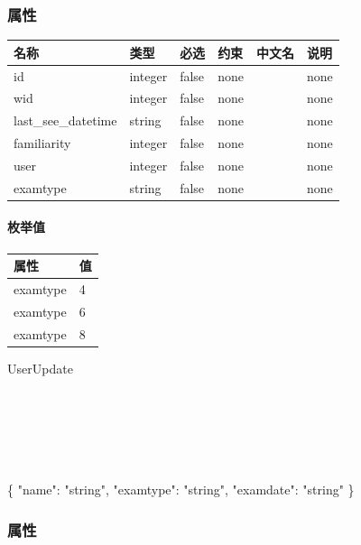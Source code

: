 \documentclass[
]{article}
\newenvironment{Shaded}{}{}
\newcommand{\DataTypeTok}[1]{\textcolor[rgb]{0.56,0.13,0.00}{#1}}
\newcommand{\FunctionTok}[1]{\textcolor[rgb]{0.02,0.16,0.49}{#1}}
\newcommand{\StringTok}[1]{\textcolor[rgb]{0.25,0.44,0.63}{#1}}
\begin{document}
\hypertarget{ux5c5eux6027-2}{%
\subsubsection{属性}\label{ux5c5eux6027-2}}

\begin{longtable}[]{@{}llllll@{}}
\toprule
名称 & 类型 & 必选 & 约束 & 中文名 & 说明 \\
\midrule
\endhead
id & integer & false & none & & none \\
wid & integer & false & none & & none \\
last\_see\_datetime & string & false & none & & none \\
familiarity & integer & false & none & & none \\
user & integer & false & none & & none \\
examtype & string & false & none & & none \\
\bottomrule
\end{longtable}

\hypertarget{ux679aux4e3eux503c-9}{%
\paragraph{枚举值}\label{ux679aux4e3eux503c-9}}

\begin{longtable}[]{@{}ll@{}}
\toprule
属性 & 值 \\
\midrule
\endhead
examtype & 4 \\
examtype & 6 \\
examtype & 8 \\
\bottomrule
\end{longtable}

UserUpdate

\strut \\
\strut \\
\strut \\

\begin{Shaded}
\begin{Highlighting}[]
\FunctionTok{\{}
  \DataTypeTok{"name"}\FunctionTok{:} \StringTok{"string"}\FunctionTok{,}
  \DataTypeTok{"examtype"}\FunctionTok{:} \StringTok{"string"}\FunctionTok{,}
  \DataTypeTok{"examdate"}\FunctionTok{:} \StringTok{"string"}
\FunctionTok{\}}
\end{Highlighting}
\end{Shaded}

\hypertarget{ux5c5eux6027-3}{%
\subsubsection{属性}\label{ux5c5eux6027-3}}
\end{document}
